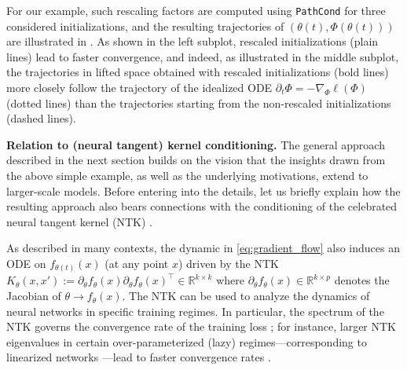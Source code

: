 \documentclass{article}
\theoremstyle{plain}
\theoremstyle{definition}
\theoremstyle{remark}
\def\R{{\mathbb{R}}}
\def\pathcond{{\texttt{PathCond} }}
\begin{document}
For our example, such rescaling factors are computed using \pathcond for three considered initializations, 
and the resulting trajectories of $(\theta(t), \Phi(\theta(t)))$ are illustrated in . 
As shown in the left subplot, rescaled initializations (plain lines) lead to faster convergence, 
and indeed, as illustrated in the middle subplot, the trajectories 
in lifted space obtained with rescaled initializations (bold lines) more closely 
follow the trajectory of the idealized ODE $\partial_t \Phi = - \nabla_\Phi \ell(\Phi)$ (dotted lines) 
than the trajectories starting from the non-rescaled initializations (dashed lines). 

\textbf{Relation to (neural tangent) kernel conditioning.}
The general approach described in the next section builds on the vision 
that the insights drawn from the above simple example, as well as the underlying motivations,  
extend to larger-scale models. Before entering into the details, let us briefly explain 
how the resulting approach also bears connections with the conditioning of the celebrated neural tangent kernel (NTK) \citep{jacot2018neural}. 

As described in many contexts, the dynamic in \eqref{eq:gradient_flow} also induces an ODE on $f_{\theta(t)}(x)$ (at any point $x$)
driven by the NTK $K_\theta(x,x') := \partial_\theta f_\theta(x) \partial_\theta f_\theta(x)^\top \in \R^{k \times k}$ \citep{jacot2018neural}
where $\partial_\theta f_{\theta}(x) \in \R^{k \times p}$ denotes the Jacobian of $\theta \to f_{\theta}(x)$.
The NTK can be used to analyze the dynamics of neural networks in specific training regimes.
In particular, the spectrum of the NTK governs the convergence rate of the training loss \citep{bowman2023brief}; 
for instance, larger NTK eigenvalues in certain over-parameterized (lazy) regimes—corresponding
to linearized networks \citep{chizat2019lazy}—lead to faster convergence rates \citep{jacot2018neural, arora2019fine}.
\end{document}

